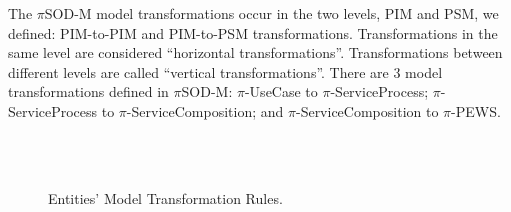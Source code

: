 The $\pi$SOD-M model transformations occur in the two levels, PIM and PSM,
we defined:  PIM-to-PIM and PIM-to-PSM transformations. Transformations in the
same level are considered ``horizontal transformations''. Transformations
between different levels are called ``vertical transformations''. There are 3
model transformations defined in $\pi$SOD-M: $\pi$-UseCase to
$\pi$-ServiceProcess; $\pi$-ServiceProcess to $\pi$-ServiceComposition; and
$\pi$-ServiceComposition to $\pi$-PEWS.

\begin{figure}[ht!]
  \centering
  ~
  ~
  ~ %
  \\
  ~
  ~
  ~ %
  \caption{Entities' Model Transformation Rules.}
  \label{fig:rules}
\end{figure}




